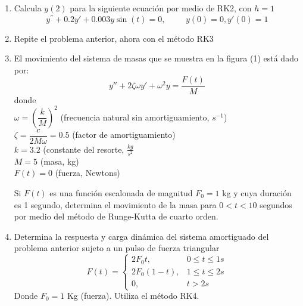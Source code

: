 \documentclass[letterpaper]{article}
\begin{document}
\begin{enumerate}
\begin{enumerate}
\end{enumerate}
\item Calcula $y(2)$ para la siguiente ecuación por medio de RK2, con $h=1$
\[ y^{''} +0.2 y{'} + 0.003 y \sin(t) = 0, \hspace{1cm} y(0)=0, y{'}(0)=1 \]
\item Repite el problema anterior, ahora con el método RK3
\item El movimiento del sistema de masas que se muestra en la figura (1) está dado por:
\[ y'' + 2 \zeta \omega y' + \omega^{2}y = \dfrac{F(t)}{M}\]
donde \\ 
$\omega = \left( \dfrac{k}{M} \right)^{2}$ (frecuencia natural sin amortiguamiento, $s^{-1}$) \\
$\zeta = \dfrac{c}{2M\omega}=0.5$ (factor de amortiguamiento) \\
$k = 3.2$ (constante del resorte, $\frac{kg}{s^{2}}$ \\
$M=5$ (masa, kg) \\
$F(t) = 0$ (fuerza, Newtons)
\begin{center}
\end{center}
Si $F(t)$ es una función escalonada de magnitud $F_{0}=1$ kg y cuya duración es 1 segundo, determina el movimiento de la masa para $0<t<10$ segundos por medio del método de Runge-Kutta de cuarto orden.
\item Determina la respuesta y carga dinámica del sistema amortiguado del problema anterior sujeto a un pulso de fuerza triangular
\begin{equation*}
F(t) =
	\begin{cases}
2F_{0}t,  & 0 \leq t \leq 1 s\\
2F_{0}(1-t), & 1 \leq t \leq 2 s\\
0, & t>2 s
\end{cases}
\end{equation*}
Donde $F_{0}=1$ Kg (fuerza). Utiliza el método RK4.
\end{enumerate}
\end{document}
